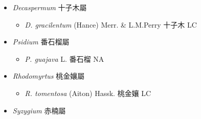 
  \begin{itemize}
 \item[] \textit{Decaspermum} 十子木屬
                                
  \begin{itemize}
        \item[] \textit{D. gracilentum} (Hance) Merr. \& L.M.Perry  十子木   LC
  \end{itemize}
 \item[] \textit{Psidium} 番石榴屬
                                
  \begin{itemize}
        \item[] \textit{P. guajava} L.  番石榴   NA
  \end{itemize}
 \item[] \textit{Rhodomyrtus} 桃金孃屬
                                
  \begin{itemize}
        \item[] \textit{R. tomentosa} (Aiton) Hassk.  桃金孃   LC
  \end{itemize}
 \item[] \textit{Syzygium} 赤楠屬
                                

\end{itemize}

